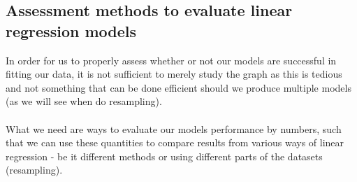 \documentclass[../main.tex]{subfiles}
\begin{document}











 
 
\subsection{Assessment methods to evaluate linear regression models}\label{refmethod:assessment_method_}
In order for us to properly assess whether or not our models are successful in fitting our data, it is not sufficient to merely study the graph as this is tedious and not something that can be done efficient should we produce multiple models (as we will see when do resampling). \\ \\What we need are ways to evaluate our models performance by numbers, such that we can use these quantities to compare results from various ways of linear regression - be it different methods or using different parts of the datasets (resampling).
\end{document}
